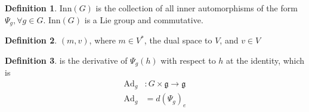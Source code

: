 \documentclass[a4paper]{article}
\theoremstyle{definition}
\newtheorem{definition}{Definition}
\theoremstyle{plain}
\begin{document}
\begin{definition}
 $\mathrm{Inn}(G)$ is the collection of all inner automorphisms of the form $\Psi_g,\forall g\in G$. $\mathrm{Inn}(G)$ is a Lie group and commutative.
\end{definition}

\begin{definition}
 $(m,v)$, where $m\in V^*$, the dual space to $V$, and $v\in V$
\end{definition}

\begin{definition}
 is the derivative of $\Psi_g(h)$ with respect to $h$ at the identity, which is
\begin{align*}
    \mathrm{Ad}_g&:G\times\mathfrak{g}\rightarrow\mathfrak{g}\\
    \mathrm{Ad}_g&=d(\Psi_g)_e
\end{align*}
\end{definition}
\end{document}
